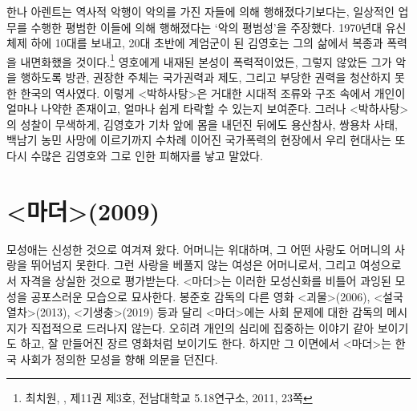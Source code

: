 한나 아렌트는 역사적 악행이 악의를 가진 자들에 의해 행해졌다기보다는, 일상적인 업무를 수행한 평범한 이들에 의해 행해졌다는 `악의 평범성'을 주장했다. 1970년대 유신체제 하에 10대를 보내고, 20대 초반에 계엄군이 된 김영호는 그의 삶에서 복종과 폭력을 내면화했을 것이다.\footnote{최치원, ,  제11권 제3호, 전남대학교 5.18연구소, 2011, 23쪽} 영호에게 내재된 본성이 폭력적이었든, 그렇지 않았든 그가 악을 행하도록 방관, 권장한 주체는 국가권력과 제도, 그리고 부당한 권력을 청산하지 못한 한국의 역사였다. 이렇게 <박하사탕>은 거대한 시대적 조류와 구조 속에서 개인이 얼마나 나약한 존재이고, 얼마나 쉽게 타락할 수 있는지 보여준다. 그러나 <박하사탕>의 성찰이 무색하게, 김영호가 기차 앞에 몸을 내던진 뒤에도 용산참사, 쌍용차 사태, 백남기 농민 사망에 이르기까지 수차례 이어진 국가폭력의 현장에서 우리 현대사는 또다시 수많은 김영호와 그로 인한 피해자를 낳고 말았다.

\section*{<마더>(2009)}

모성애는 신성한 것으로 여겨져 왔다. 어머니는 위대하며, 그 어떤 사랑도 어머니의 사랑을 뛰어넘지 못한다. 그런 사랑을 베풀지 않는 여성은 어머니로서, 그리고 여성으로서 자격을 상실한 것으로 평가받는다. <마더>는 이러한 모성신화를 비틀어 과잉된 모성을 공포스러운 모습으로 묘사한다. 봉준호 감독의 다른 영화 <괴물>(2006), <설국열차>(2013), <기생충>(2019) 등과 달리 <마더>에는 사회 문제에 대한 감독의 메시지가 직접적으로 드러나지 않는다. 오히려 개인의 심리에 집중하는 이야기 같아 보이기도 하고, 잘 만들어진 장르 영화처럼 보이기도 한다. 하지만 그 이면에서 <마더>는 한국 사회가 정의한 모성을 향해 의문을 던진다.

